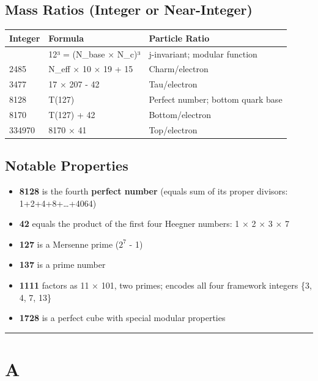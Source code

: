\documentclass[
  11pt,
  letterpaper,
  twoside,
  openany]{book}
\makeatletter
\providecommand{\tightlist}{%
  \setlength{\itemsep}{0pt}\setlength{\parskip}{0pt}}
\let\orig@section\section
\renewcommand{\section}{\needspace{8\baselineskip}\orig@section}
\let\orig@subsection\subsection
\renewcommand{\subsection}{\needspace{6\baselineskip}\orig@subsection}
\makeatother
\begin{document}
\subsection{Mass Ratios (Integer or
Near-Integer)}\label{mass-ratios-integer-or-near-integer}

\begin{longtable}[]{@{}lll@{}}
\toprule\noalign{}
Integer & Formula & Particle Ratio \\
\midrule\noalign{}
\endhead
\bottomrule\noalign{}
\endlastfoot
1728 & 12³ = (N\_base × N\_c)³ & j-invariant; modular function \\
2485 & N\_eff × 10 × 19 + 15 & Charm/electron \\
3477 & 17 × 207 - 42 & Tau/electron \\
8128 & T(127) & Perfect number; bottom quark base \\
8170 & T(127) + 42 & Bottom/electron \\
334970 & 8170 × 41 & Top/electron \\
\end{longtable}

\subsection{Notable Properties}\label{notable-properties}

\begin{itemize}
\tightlist
\item
  \textbf{8128} is the fourth \textbf{perfect number} (equals sum of its
  proper divisors: 1+2+4+8+\ldots+4064)
\item
  \textbf{42} equals the product of the first four Heegner numbers: 1 ×
  2 × 3 × 7
\item
  \textbf{127} is a Mersenne prime (\(2^7\) - 1)
\item
  \textbf{137} is a prime number
\item
  \textbf{1111} factors as 11 × 101, two primes; encodes all four
  framework integers \{3, 4, 7, 13\}
\item
  \textbf{1728} is a perfect cube with special modular properties
\end{itemize}

\begin{center}\rule{0.5\linewidth}{0.5pt}\end{center}

\section{A}\label{a}
\end{document}
